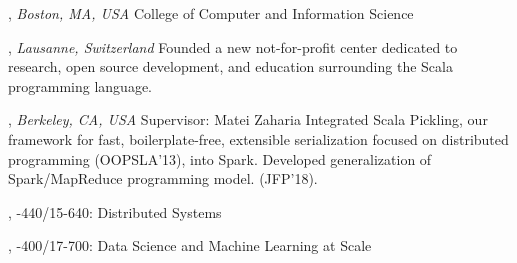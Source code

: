 \documentclass[9pt]{article}
\begin{document}
, \emph{Boston, MA, USA} \vspace{0.01in} 
\newline{}
\newline College of Computer and Information Science
\bigskip

, \emph{Lausanne, Switzerland} \vspace{0.01in} 
\newline{}
\newline\noindent Founded a new not-for-profit center dedicated to research,\vspace{-0.03in}
\newline\noindent open source development, and education surrounding the Scala\vspace{-0.03in}
\newline\noindent programming language.
\bigskip

, \emph{Berkeley, CA, USA} \vspace{0.01in} 
\newline{}
\newline\noindent Supervisor: Matei Zaharia
\newline\noindent Integrated Scala Pickling, our framework for fast, boilerplate-free, extensible\vspace{-0.03in}
\newline\noindent serialization focused on distributed programming (OOPSLA'13), into Spark.\vspace{-0.03in}
\newline\noindent Developed generalization of Spark/MapReduce programming model. (JFP'18).

\pagebreak

\medskip
{}

,  
\newline{}-440/15-640: Distributed Systems 
\bigskip

,  
\newline{}-400/17-700: Data Science and Machine Learning at Scale 
\bigskip
\end{document}
